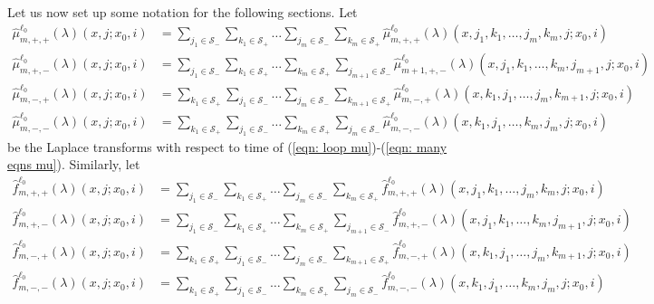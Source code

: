 Let us now set up some notation for the following sections. Let 
\begin{align}
	\widehat \mu_{m,+,+}^{\ell_0}(\lambda)( x,j;x_0,i) &= \sum_{j_1\in\mathcal S_-} \sum_{k_1\in\mathcal S_+}\dots \sum_{j_m\in\mathcal S_-}\sum_{k_m\in\mathcal S_+}\widehat  \mu_{m,+,+}^{\ell_0}(\lambda)( x, j_1,k_1,\dots,j_m,k_m, j; x_0,i)  \label{eqn: mu advh}
	\\\widehat \mu^{\ell_0}_{m,+,-}(\lambda)( x, j; x_0,i) &= \sum_{j_1\in\mathcal S_-} \sum_{k_1\in\mathcal S_+}\dots \sum_{k_m\in\mathcal S_+}\sum_{j_{m+1}\in\mathcal S_-}\widehat \mu^{\ell_0}_{m+1,+,-}(\lambda)( x, j_1,k_1,\dots,k_m,j_{m+1}, j; x_0,i)
	\\\widehat \mu^{\ell_0}_{m,-,+}(\lambda)( x, j; x_0,i) &= \sum_{k_1\in\mathcal S_+} \sum_{j_1\in\mathcal S_-}\dots \sum_{j_m\in\mathcal S_-}\sum_{k_{m+1}\in\mathcal S_+}\widehat \mu^{\ell_0}_{m,-,+}(\lambda)( x, k_1,j_1,\dots,j_m,k_{m+1}, j; x_0,i) 
	\\\widehat \mu^{\ell_0}_{m,-,-}(\lambda)( x, j; x_0,i) &= \sum_{k_1\in\mathcal S_+} \sum_{j_1\in\mathcal S_-}\dots \sum_{k_m\in\mathcal S_+}\sum_{j_m\in\mathcal S_-}\widehat \mu^{\ell_0}_{m,-,-}(\lambda)( x, k_1, j_1,\dots,k_m,j_m, j; x_0,i) 
\end{align}
be the Laplace transforms with respect to time of (\ref{eqn: loop mu})-(\ref{eqn: many eqns mu}). Similarly, let
\begin{align}
            	\widehat f^{\ell_0}_{m,+,+}(\lambda)(x,j;x_0,i) &= \sum_{j_1\in\mathcal S_-} \sum_{k_1\in\mathcal S_+}\dots \sum_{j_m\in\mathcal S_-}\sum_{k_m\in\mathcal S_+}  \widehat f^{\ell_0}_{m,+,+}(\lambda)( x, j_1,k_1,\dots,j_m,k_m, j; x_0,i)\label{eqn: f advh}
		\\\widehat f^{\ell_0}_{m,+,-}(\lambda)(x, j; x_0,i)  &= \sum_{j_1\in\mathcal S_-} \sum_{k_1\in\mathcal S_+}\dots \sum_{k_m\in\mathcal S_+}\sum_{j_{m+1}\in\mathcal S_-}\widehat f^{\ell_0}_{m,+,-}(\lambda)(x, j_1,k_1,\dots,k_m,j_{m+1}, j; x_0,i) 
	\\\widehat f^{\ell_0}_{m,-,+}(\lambda)(x, j; x_0,i)  &= \sum_{k_1\in\mathcal S_+} \sum_{j_1\in\mathcal S_-}\dots \sum_{j_m\in\mathcal S_-}\sum_{k_{m+1}\in\mathcal S_+}\widehat f^{\ell_0}_{m,-,+}(\lambda)(x, k_1,j_1,\dots,j_m,k_{m+1}, j; x_0,i)  
	\\\widehat f^{\ell_0}_{m,-,-}(\lambda)(x, j; x_0,i)  &= \sum_{k_1\in\mathcal S_+} \sum_{j_1\in\mathcal S_-}\dots \sum_{k_m\in\mathcal S_+}\sum_{j_m\in\mathcal S_-}\widehat f^{\ell_0}_{m,-,-}(\lambda)(x, k_1, j_1,\dots,k_m,j_m, j; x_0,i)  \label{eqn: asdlgjlll} 
\end{align}
